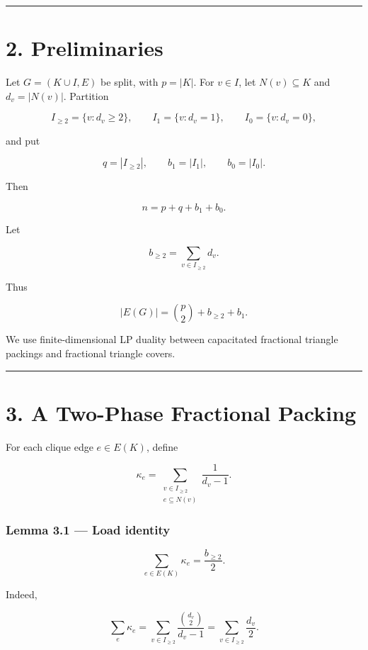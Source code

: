 \documentclass[11pt,a4paper]{article}
\begin{document}
\begin{center}\rule{0.5\linewidth}{0.5pt}\end{center}

\section{2. Preliminaries}\label{preliminaries}

Let \(G=(K\cup I,E)\) be split, with \(p=|K|\). For \(v\in I\), let \(N(v)\subseteq K\) and \(d_v=|N(v)|\). Partition

\[
I_{\ge2}=\{v:d_v\ge2\},
\qquad
I_1=\{v:d_v=1\},
\qquad
I_0=\{v:d_v=0\},
\]

and put

\[
q=|I_{\ge2}|,
\qquad
b_1=|I_1|,
\qquad
b_0=|I_0|.
\]

Then

\[
n=p+q+b_1+b_0.
\tag{2.1}
\]

Let

\[
b_{\ge2}=\sum_{v\in I_{\ge2}}d_v.
\]

Thus

\[
|E(G)|=\binom p2+b_{\ge2}+b_1.
\tag{2.2}
\]

We use finite-dimensional LP duality between capacitated fractional triangle packings and fractional triangle covers.

\begin{center}\rule{0.5\linewidth}{0.5pt}\end{center}

\section{3. A Two-Phase Fractional Packing}\label{a-two-phase-fractional-packing}

For each clique edge \(e\in E(K)\), define

\[
\kappa_e
=
\sum_{\substack{v\in I_{\ge2}\\e\subseteq N(v)}}
\frac1{d_v-1}.
\tag{3.1}
\]

\subsubsection{Lemma 3.1 --- Load identity}\label{lemma-3.1-load-identity}

\[
\boxed{
\sum_{e\in E(K)}\kappa_e=\frac{b_{\ge2}}2.
}
\tag{3.2}
\]

Indeed,

\[
\sum_e\kappa_e
=
\sum_{v\in I_{\ge2}}
\frac{\binom{d_v}{2}}{d_v-1}
=
\sum_{v\in I_{\ge2}}\frac{d_v}{2}.
\]
\end{document}
